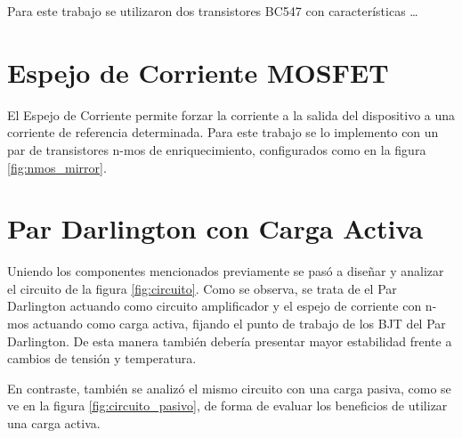 Para este trabajo se utilizaron dos transistores BC547 con características \dots

\section{Espejo de Corriente MOSFET}

El Espejo de Corriente permite forzar la corriente a la salida del dispositivo a una corriente de referencia determinada. Para este trabajo se lo implemento con un par de transistores n-mos de enriquecimiento, configurados como en la figura \ref{fig:nmos_mirror}.

\newpage

\section{Par Darlington con Carga Activa}
Uniendo los componentes mencionados previamente se pasó a diseñar y analizar el circuito de la figura \ref{fig:circuito}. Como se observa, se trata de el Par Darlington actuando como circuito amplificador y el espejo de corriente con n-mos actuando como carga activa, fijando el punto de trabajo de los BJT del Par Darlington. De esta manera también debería presentar mayor estabilidad frente a cambios de tensión y temperatura.

En contraste, también se analizó el mismo circuito con una carga pasiva, como se ve en la figura \ref{fig:circuito_pasivo}, de forma de evaluar los beneficios de utilizar una carga activa.

